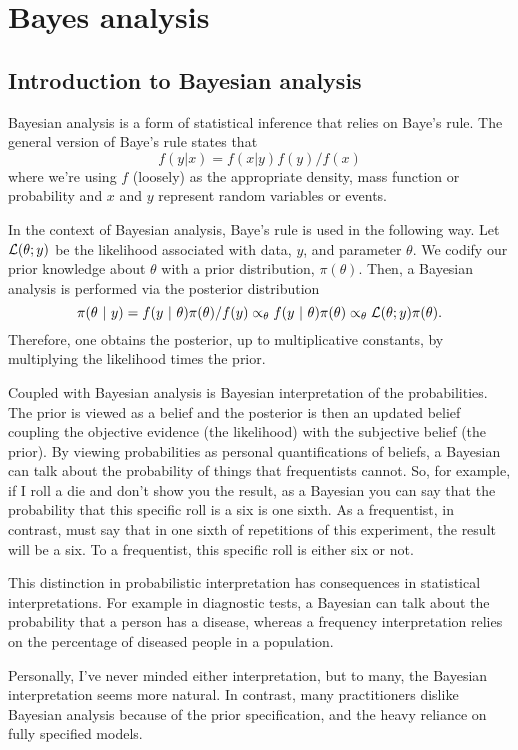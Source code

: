 \section{Bayes analysis}

\subsection{Introduction to Bayesian analysis}

Bayesian analysis is a form of statistical inference
that relies on Baye's rule. The general version of Baye's rule states
that 
$$
f(y | x) = f(x | y) f(y) / f(x)
$$
where we're using $f$ (loosely) as the appropriate density, mass function
or probability and $x$ and $y$ represent random variables or events. 

In the context of Bayesian analysis, Baye's rule is used in the following
way. Let ${\cal L}(\theta; y)$ be the likelihood associated with data, $y$,
and  parameter $\theta$. We codify our prior knowledge about $\theta$ with
a prior distribution, $\pi(\theta)$. Then, a Bayesian analysis is performed
via the posterior distribution 
$$
\pi(\theta ~|~ y) = f(y ~|~ \theta) \pi(\theta) / f(y) 
\propto_\theta f(y ~|~ \theta) \pi(\theta) \propto_\theta {\cal L}(\theta; y) \pi(\theta).
$$
Therefore, one obtains the posterior, up to multiplicative constants, 
by multiplying the likelihood times the prior. 

Coupled with Bayesian analysis is Bayesian interpretation of the probabilities.
The prior is viewed as a belief and the posterior is then an updated belief
coupling the objective evidence (the likelihood) with the subjective 
belief (the prior). By viewing probabilities as personal quantifications
of beliefs, a Bayesian can talk about the probability of things that frequentists
cannot. So, for example, if I roll a die and don't show you the result, as a Bayesian you
can say that the probability that this specific roll is a six is one sixth. As a frequentist,
in contrast, must say that in one sixth of repetitions of this experiment, the result
will be a six. To a frequentist, this specific roll is either six or not. 

This distinction in probabilistic interpretation 
has consequences in statistical interpretations. For example in
diagnostic tests,  a Bayesian can talk about the probability that a person has a disease, whereas
a frequency interpretation relies on the percentage  of diseased people in a 
population. 

Personally, I've never minded either interpretation,
but to many, the Bayesian interpretation seems more natural. In contrast, many
practitioners dislike Bayesian analysis because of the prior specification, and
the heavy reliance on fully specified models. 

